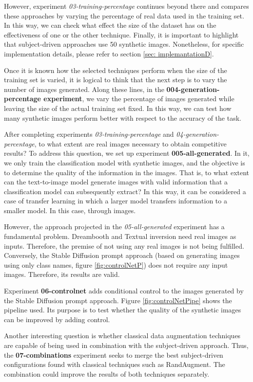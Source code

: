 However, experiment \textit{03-training-percentage} continues beyond there and compares these approaches by varying the percentage of real data used in the training set. In this way, we can check what effect the size of the dataset has on the effectiveness of one or the other technique. Finally, it is important to highlight that subject-driven approaches use 50 synthetic images. Nonetheless, for specific implementation details, please refer to section \ref{sec: implemantationD}.

Once it is known how the selected techniques perform when the size of the training set is varied, it is logical to think that the next step is to vary the number of images generated. Along these lines, in the \textbf{004-generation-percentage experiment}, we vary the percentage of images generated while leaving the size of the actual training set fixed. In this way, we can test how many synthetic images perform better with respect to the accuracy of the task.

After completing experiments \textit{03-training-percentage} and \textit{04-generation-percentage}, to what extent are real images necessary to obtain competitive results? To address this question, we set up experiment \textbf{005-all-generated}. In it, we only train the classification model with synthetic images, and the objective is to determine the quality of the information in the images. That is, to what extent can the text-to-image model generate images with valid information that a classification model can subsequently extract? In this way, it can be considered a case of transfer learning in which a larger model transfers information to a smaller model. In this case, through images.

However, the approach projected in the \textit{05-all-generated} experiment has a fundamental problem. Dreambooth and Textual inversion need real images as inputs. Therefore, the premise of not using any real images is not being fulfilled. Conversely, the Stable Diffusion prompt approach (based on generating images using only class names, figure \ref{fig:controlNetP}) does not require any input images. Therefore, its results are valid.

Experiment \textbf{06-controlnet} adds conditional control to the images generated by the Stable Diffusion prompt approach. Figure \ref{fig:controlNetPipe} shows the pipeline used. Its purpose is to test whether the quality of the synthetic images can be improved by adding control.

Another interesting question is whether classical data augmentation techniques are capable of being used in combination with the subject-driven approach. Thus, the \textbf{07-combinations} experiment seeks to merge the best subject-driven configurations found with classical techniques such as RandAugment. The combination could improve the results of both techniques separately. 


